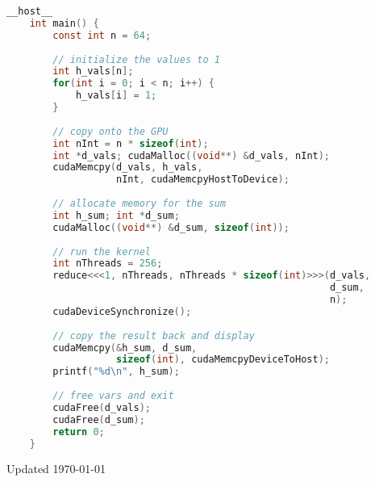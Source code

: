 \documentclass[]{article}
\begin{document}
\begin{tcolorbox}[left=14pt, arc=0pt, outer arc=0pt, colframe=blue!5, colback=blue!5]
\begin{lstlisting}[language=C]
    __host__
    int main() {
        const int n = 64;
    
        // initialize the values to 1
        int h_vals[n];
        for(int i = 0; i < n; i++) {
            h_vals[i] = 1;
        }
        
        // copy onto the GPU
        int nInt = n * sizeof(int);
        int *d_vals; cudaMalloc((void**) &d_vals, nInt);
        cudaMemcpy(d_vals, h_vals, 
                   nInt, cudaMemcpyHostToDevice);
        
        // allocate memory for the sum
        int h_sum; int *d_sum; 
        cudaMalloc((void**) &d_sum, sizeof(int));
    
        // run the kernel
        int nThreads = 256;
        reduce<<<1, nThreads, nThreads * sizeof(int)>>>(d_vals,
                                                        d_sum, 
                                                        n);
        cudaDeviceSynchronize();
        
        // copy the result back and display
        cudaMemcpy(&h_sum, d_sum,
                   sizeof(int), cudaMemcpyDeviceToHost);
        printf("%d\n", h_sum);
    
        // free vars and exit
        cudaFree(d_vals); 
        cudaFree(d_sum); 
        return 0;
    }
\end{lstlisting}
\end{tcolorbox}





\vfill
\begin{tiny}Updated \today \end{tiny}
\end{document}
